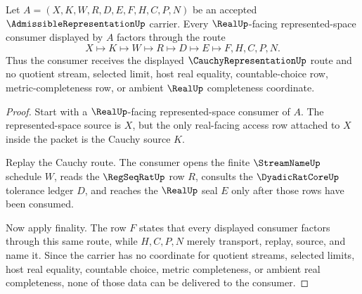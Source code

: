 \begin{theorem}
\label{thm:admissible-representation-real-cauchy-handoff}
Let $A=(X,K,W,R,D,E,F,H,C,P,N)$ be an accepted $\AdmissibleRepresentationUp$ carrier. Every $\RealUp$-facing represented-space consumer displayed by $A$ factors through the route
$$
X \longmapsto K \longmapsto W \longmapsto R \longmapsto D \longmapsto E \longmapsto F,H,C,P,N .
$$
Thus the consumer receives the displayed $\CauchyRepresentationUp$ route and no quotient stream, selected limit, host real equality, countable-choice row, metric-completeness row, or ambient $\RealUp$ completeness coordinate.
\end{theorem}
\begin{proof}
Start with a $\RealUp$-facing represented-space consumer of $A$. The represented-space source is $X$, but the only real-facing access row attached to $X$ inside the packet is the Cauchy source $K$.

Replay the Cauchy route. The consumer opens the finite $\StreamNameUp$ schedule $W$, reads the $\RegSeqRatUp$ row $R$, consults the $\DyadicRatCoreUp$ tolerance ledger $D$, and reaches the $\RealUp$ seal $E$ only after those rows have been consumed.

Now apply finality. The row $F$ states that every displayed consumer factors through this same route, while $H,C,P,N$ merely transport, replay, source, and name it. Since the carrier has no coordinate for quotient streams, selected limits, host real equality, countable choice, metric completeness, or ambient real completeness, none of those data can be delivered to the consumer.
\end{proof}

\begin{closurestatus}{\AdmissibleRepresentationUp}
  \theoryclosure{\seedClosure}
  \formalstatus{\unformalizedV}
\end{closurestatus}
